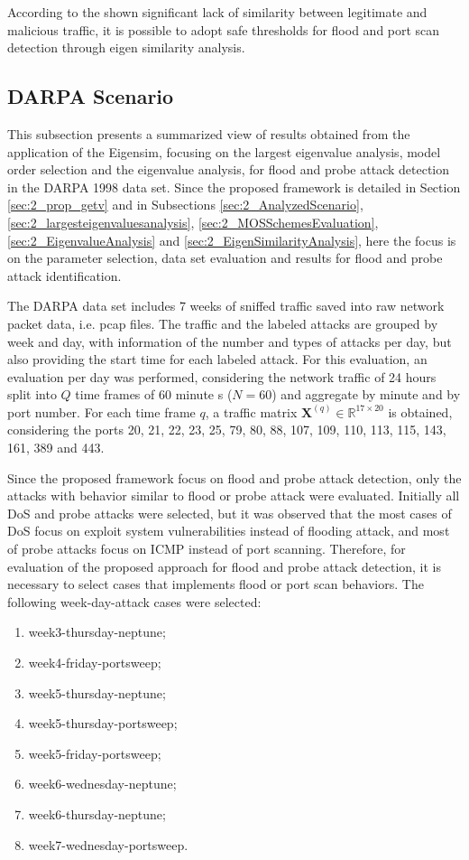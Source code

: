 According to the shown significant lack of similarity between legitimate and malicious traffic, it is possible to adopt safe thresholds for flood and port scan detection through eigen similarity analysis.

\subsection{DARPA Scenario}
\label{sec:2_DarpaEvaluation}

This subsection presents a summarized view of results obtained from the application of the Eigensim, focusing on the largest eigenvalue analysis, model order selection and the eigenvalue analysis, for flood and probe attack detection in the DARPA 1998 data set. Since the proposed framework is detailed in Section \ref{sec:2_prop_getv} and in Subsections \ref{sec:2_AnalyzedScenario}, \ref{sec:2_largesteigenvaluesanalysis}, \ref{sec:2_MOSSchemesEvaluation}, \ref{sec:2_EigenvalueAnalysis} and \ref{sec:2_EigenSimilarityAnalysis}, here the focus is on the parameter selection, data set evaluation and results for flood and probe attack identification.

The DARPA data set includes 7 weeks of sniffed traffic saved into raw network packet data, i.e. pcap files. The traffic and the labeled attacks are grouped by week and day, with information of the number and types of attacks per day, but also providing the start time for each labeled attack. For this evaluation, an evaluation per day was performed, considering the network traffic of 24 hours split into $Q$ time frames of 60 minute
s ($N = 60$) and aggregate by minute and by port number. For each time frame $q$, a traffic matrix $\pmb{X}^{(q)} \in \mathbb{R}^{17 \times 20}$ is obtained, considering the ports 20, 21, 22, 23, 25, 79, 80, 88, 107, 109, 110, 113, 115, 143, 161, 389 and 443.

Since the proposed framework focus on flood and probe attack detection, only the attacks with behavior similar to flood or probe attack were evaluated. Initially all DoS and probe attacks were selected, but it was observed that the most cases of DoS focus on exploit system vulnerabilities instead of flooding attack, and most of probe attacks focus on ICMP instead of port scanning. Therefore, for evaluation of the proposed approach for flood and probe attack detection, it is necessary to select cases that implements flood or port scan behaviors. The following week-day-attack cases  were selected: 

\begin{enumerate}
	\item week3-thursday-neptune;
	\item week4-friday-portsweep;
	\item week5-thursday-neptune;
	\item week5-thursday-portsweep;
	\item week5-friday-portsweep;
	\item week6-wednesday-neptune;
	\item week6-thursday-neptune;
	\item week7-wednesday-portsweep.
\end{enumerate}

